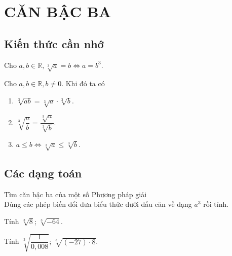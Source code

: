 \section{CĂN BẬC BA}
\subsection{Kiến thức cần nhớ}
\begin{dn}
Cho $ a, b \in \mathbb{R}, \sqrt[3]{a} = b \Leftrightarrow a = b^3.$
\end{dn}

\begin{tc}
Cho $ a, b \in \mathbb{R}, b \neq 0 $. Khi đó ta có
\begin{enumerate}
	\item $ \sqrt[3]{ab} = \sqrt[3]{a} \cdot \sqrt[3]{b} $.
	\item $ \sqrt[3]{\dfrac{a}{b}} = \dfrac{\sqrt[3]{a}}{\sqrt[3]{b}} $.
	\item $ a \leqslant b \Leftrightarrow \sqrt[3]{a} \leqslant \sqrt[3]{b} $.
\end{enumerate}
\end{tc}
     
\subsection{Các dạng toán}

\begin{dang}{Tìm căn bậc ba của một số}
    Phương pháp giải\\
    Dùng các phép biến đổi đưa biểu thức dưới dấu căn về dạng $ a^3 $ rồi tính.
\end{dang}

\begin{vd}
    Tính $ \sqrt[3]{8} $; $ \sqrt[3]{-64} $.
\end{vd}

\begin{vd}
    Tính $ \sqrt[3]{\dfrac{1}{0{,}008}} $; $ \sqrt[3]{\left(-27\right) \cdot 8} $.
\end{vd}

